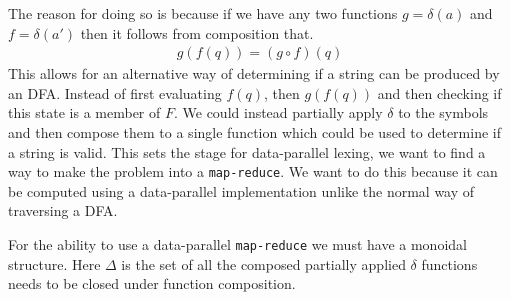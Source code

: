 \documentclass[a4paper,12pt]{article}
\theoremstyle{definition}
\begin{document}
The reason for doing so is because if we have any two functions $g = \delta(a)$ and $f = \delta(a')$ then it follows from composition that.
\begin{align*}
  g(f(q)) = (g \circ f) (q)
\end{align*}
This allows for an alternative way of determining if a string can be produced by an DFA. Instead of first evaluating $f(q)$, then $g(f(q))$ and then checking if this state is a member of $F$. We could instead partially apply $\delta$ to the symbols and then compose them to a single function which could be used to determine if a string is valid. This sets the stage for data-parallel lexing, we want to find a way to make the problem into a \texttt{map-reduce}. We want to do this because it can be computed using a data-parallel implementation unlike the normal way of traversing a DFA.

For the ability to use a data-parallel \texttt{map-reduce} we must have a monoidal structure. Here $\Delta$ is the set of all the composed partially applied $\delta$ functions needs to be closed under function composition.
\end{document}
